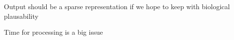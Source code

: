 Output should be a sparse representation if we hope to keep with biological plausability

Time for processing is a big issue